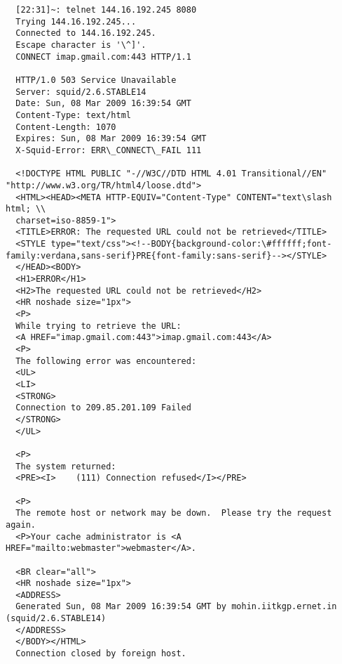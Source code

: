\begin{lstlisting}
  [22:31]~: telnet 144.16.192.245 8080
  Trying 144.16.192.245...
  Connected to 144.16.192.245.
  Escape character is '\^]'.
  CONNECT imap.gmail.com:443 HTTP/1.1

  HTTP/1.0 503 Service Unavailable
  Server: squid/2.6.STABLE14
  Date: Sun, 08 Mar 2009 16:39:54 GMT
  Content-Type: text/html
  Content-Length: 1070
  Expires: Sun, 08 Mar 2009 16:39:54 GMT
  X-Squid-Error: ERR\_CONNECT\_FAIL 111

  <!DOCTYPE HTML PUBLIC "-//W3C//DTD HTML 4.01 Transitional//EN" "http://www.w3.org/TR/html4/loose.dtd">
  <HTML><HEAD><META HTTP-EQUIV="Content-Type" CONTENT="text\slash html; \\
  charset=iso-8859-1">
  <TITLE>ERROR: The requested URL could not be retrieved</TITLE>
  <STYLE type="text/css"><!--BODY{background-color:\#ffffff;font-family:verdana,sans-serif}PRE{font-family:sans-serif}--></STYLE>
  </HEAD><BODY>
  <H1>ERROR</H1>
  <H2>The requested URL could not be retrieved</H2>
  <HR noshade size="1px">
  <P>
  While trying to retrieve the URL:
  <A HREF="imap.gmail.com:443">imap.gmail.com:443</A>
  <P>
  The following error was encountered:
  <UL>
  <LI>
  <STRONG>
  Connection to 209.85.201.109 Failed
  </STRONG>
  </UL>

  <P>
  The system returned:
  <PRE><I>    (111) Connection refused</I></PRE>

  <P>
  The remote host or network may be down.  Please try the request again.
  <P>Your cache administrator is <A HREF="mailto:webmaster">webmaster</A>.

  <BR clear="all">
  <HR noshade size="1px">
  <ADDRESS>
  Generated Sun, 08 Mar 2009 16:39:54 GMT by mohin.iitkgp.ernet.in (squid/2.6.STABLE14)
  </ADDRESS>
  </BODY></HTML>
  Connection closed by foreign host.
\end{lstlisting}

